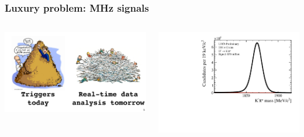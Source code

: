 \documentclass[table,xcolor=dvipsnames,professionalfonts]{beamer}
\begin{document}
\begin{frame}[t]
  \frametitle{Luxury problem: MHz signals}
  \begin{columns}\begin{column}{.6\textwidth}
  \includegraphics[width=\textwidth]{./pile.pdf}
  \end{column}\begin{column}{.4\textwidth}
  \includegraphics[height=\textwidth,angle =-90]{./Dmass.pdf}


\end{column}
\end{columns}
\end{frame}
\end{document}
